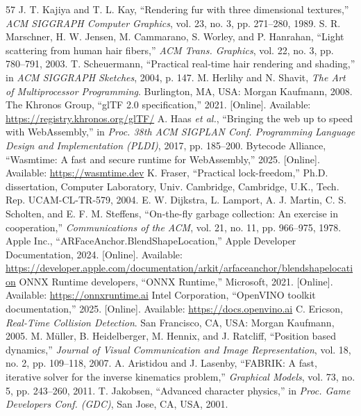 \documentclass[conference]{IEEEtran}
\begin{document}
\begin{thebibliography}{57}
 J. T. Kajiya and T. L. Kay, ``Rendering fur with three dimensional textures,'' \textit{ACM SIGGRAPH Computer Graphics}, vol. 23, no. 3, pp. 271--280, 1989.
 S. R. Marschner, H. W. Jensen, M. Cammarano, S. Worley, and P. Hanrahan, ``Light scattering from human hair fibers,'' \textit{ACM Trans. Graphics}, vol. 22, no. 3, pp. 780--791, 2003.
 T. Scheuermann, ``Practical real-time hair rendering and shading,'' in \textit{ACM SIGGRAPH Sketches}, 2004, p. 147.
 M. Herlihy and N. Shavit, \textit{The Art of Multiprocessor Programming}. Burlington, MA, USA: Morgan Kaufmann, 2008.
 The Khronos Group, ``glTF 2.0 specification,'' 2021. [Online]. Available: \url{https://registry.khronos.org/glTF/}
 A. Haas \textit{et al.}, ``Bringing the web up to speed with WebAssembly,'' in \textit{Proc. 38th ACM SIGPLAN Conf. Programming Language Design and Implementation (PLDI)}, 2017, pp. 185--200.
 Bytecode Alliance, ``Wasmtime: A fast and secure runtime for WebAssembly,'' 2025. [Online]. Available: \url{https://wasmtime.dev}
 K. Fraser, ``Practical lock-freedom,'' Ph.D. dissertation, Computer Laboratory, Univ. Cambridge, Cambridge, U.K., Tech. Rep. UCAM-CL-TR-579, 2004.
 E. W. Dijkstra, L. Lamport, A. J. Martin, C. S. Scholten, and E. F. M. Steffens, ``On-the-fly garbage collection: An exercise in cooperation,'' \textit{Communications of the ACM}, vol. 21, no. 11, pp. 966--975, 1978.
 Apple Inc., ``ARFaceAnchor.BlendShapeLocation,'' Apple Developer Documentation, 2024. [Online]. Available: \url{https://developer.apple.com/documentation/arkit/arfaceanchor/blendshapelocation}
 ONNX Runtime developers, ``ONNX Runtime,'' Microsoft, 2021. [Online]. Available: \url{https://onnxruntime.ai}
 Intel Corporation, ``OpenVINO toolkit documentation,'' 2025. [Online]. Available: \url{https://docs.openvino.ai}
 C. Ericson, \textit{Real-Time Collision Detection}. San Francisco, CA, USA: Morgan Kaufmann, 2005.
 M. Müller, B. Heidelberger, M. Hennix, and J. Ratcliff, ``Position based dynamics,'' \textit{Journal of Visual Communication and Image Representation}, vol. 18, no. 2, pp. 109--118, 2007.
 A. Aristidou and J. Lasenby, ``FABRIK: A fast, iterative solver for the inverse kinematics problem,'' \textit{Graphical Models}, vol. 73, no. 5, pp. 243--260, 2011.
 T. Jakobsen, ``Advanced character physics,'' in \textit{Proc. Game Developers Conf. (GDC)}, San Jose, CA, USA, 2001.

\end{thebibliography}
\end{document}
